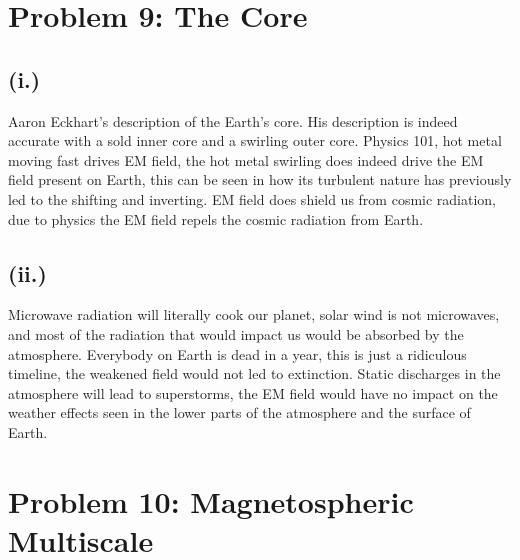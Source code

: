 \documentclass[11pt]{article}
\begin{document}
\newpage
\section*{Problem 9: The Core}

\subsection*{(i.)}
\hspace*{2em}Aaron Eckhart's description of the Earth's core. His description is indeed accurate with a sold inner core and a swirling outer core. Physics 101, hot metal moving fast drives EM field, the hot metal swirling does indeed drive the EM field present on Earth, this can be seen in how its turbulent nature has previously led to the shifting and inverting. EM field does shield us from cosmic radiation, due to physics the EM field repels the cosmic radiation from Earth.

\subsection*{(ii.)}
\hspace*{2em}Microwave radiation will literally cook our planet, solar wind is not microwaves, and most of the radiation that would impact us would be absorbed by the atmosphere. Everybody on Earth is dead in a year, this is just a ridiculous timeline, the weakened field would not led to extinction. Static discharges in the atmosphere will lead to superstorms, the EM field would have no impact on the weather effects seen in the lower parts of the atmosphere and the surface of Earth.

\newpage
\section*{Problem 10: Magnetospheric Multiscale}
\end{document}
